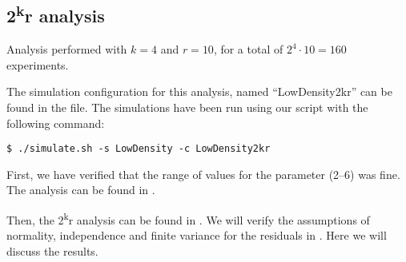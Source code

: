 \subsection{2\texorpdfstring{\textsuperscript{k}}{k}r analysis}\label{subsec:ld2kr}

Analysis performed with \(k\!=\!4\) and \(r\!=\!10\), for a total of \(2^4 \cdot
10 \!=\!160\) experiments.

The simulation configuration for this analysis, named ``LowDensity2kr'' can be
found in the  file. The simulations have been run using
our  script with the following command:
\begin{verbatim}
$ ./simulate.sh -s LowDensity -c LowDensity2kr
\end{verbatim}

First, we have verified that the range of values for the 
parameter (2--6) was fine. The analysis can be found in .

Then, the 2\textsuperscript{k}r analysis can be found in . We
will verify the assumptions of normality, independence and finite variance for
the residuals in . Here we will discuss the
results.






